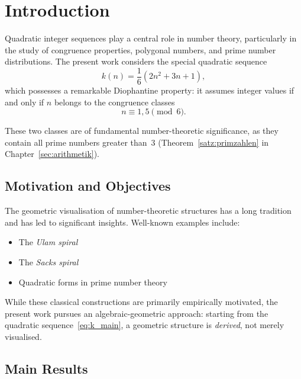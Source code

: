 \chapter{Introduction}

Quadratic integer sequences play a central role in number theory, 
particularly in the study of congruence properties, polygonal numbers, 
and prime number distributions. The present work considers the special 
quadratic sequence
\begin{equation}\label{eq:k_main}
k(n) = \frac{1}{6}(2n^2 + 3n + 1),
\end{equation}
which possesses a remarkable Diophantine property: it assumes 
integer values if and only if $n$ belongs to the congruence classes
\begin{equation}\label{eq:congruence}
n \equiv 1, 5 \pmod{6}.
\end{equation}

These two classes are of fundamental number-theoretic significance, as they
contain all prime numbers greater than~$3$ (Theorem~\ref{satz:primzahlen} in
Chapter~\ref{sec:arithmetik}).

\section*{Motivation and Objectives}

The geometric visualisation of number-theoretic structures has a long 
tradition and has led to significant insights. Well-known examples include:
\begin{itemize}[leftmargin=2em]
\item The \emph{Ulam spiral}~\cite{Stein1964}
\item The \emph{Sacks spiral}~\cite{Sacks2003}
\item Quadratic forms in prime number theory
\end{itemize}

While these classical constructions are primarily empirically motivated, 
the present work pursues an algebraic-geometric approach: 
starting from the quadratic sequence~\eqref{eq:k_main}, a geometric 
structure is \emph{derived}, not merely visualised.

\clearpage

\section*{Main Results}

